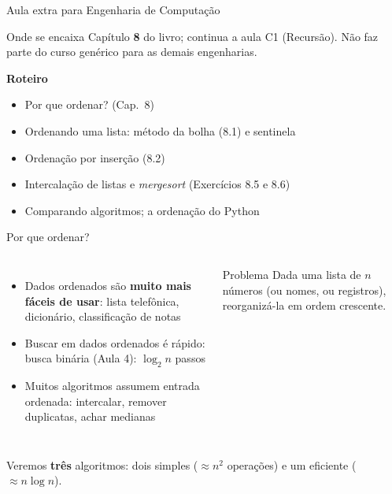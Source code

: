 \documentclass[aspectratio=169,10pt,t]{beamer}
\begin{document}
\capa

\begin{frame}{Aula extra para Engenharia de Computação}
  \begin{alertblock}{Onde se encaixa}
    Capítulo \textbf{8} do livro; continua a aula C1 (Recursão). Não faz parte do curso genérico para as demais engenharias.
  \end{alertblock}
  \textbf{Roteiro}
  \begin{itemize}
    \item Por que ordenar? (Cap.~8)
    \item Ordenando uma lista: método da bolha (8.1) e sentinela
    \item Ordenação por inserção (8.2)
    \item Intercalação de listas e \emph{mergesort} (Exercícios 8.5 e 8.6)
    \item Comparando algoritmos; a ordenação do Python
  \end{itemize}
\end{frame}

\begin{frame}{Por que ordenar?}
  \begin{columns}[T]
    \begin{itemize}
      \item Dados ordenados são \textbf{muito mais fáceis de usar}: lista telefônica, dicionário, classificação de notas
      \item Buscar em dados ordenados é rápido: \alert{busca binária} (Aula 4): \(\log_2 n\) passos
      \item Muitos algoritmos assumem entrada ordenada: intercalar, remover duplicatas, achar medianas
    \end{itemize}
    \begin{exampleblock}{Problema}
      Dada uma lista de \(n\) números (ou nomes, ou registros), reorganizá-la em ordem crescente.
    \end{exampleblock}
  \end{columns}
  \vspace{1ex}
  Veremos \textbf{três} algoritmos: dois simples (\(\approx n^2\) operações) e um eficiente (\(\approx n\log n\)).
\end{frame}
\end{document}
